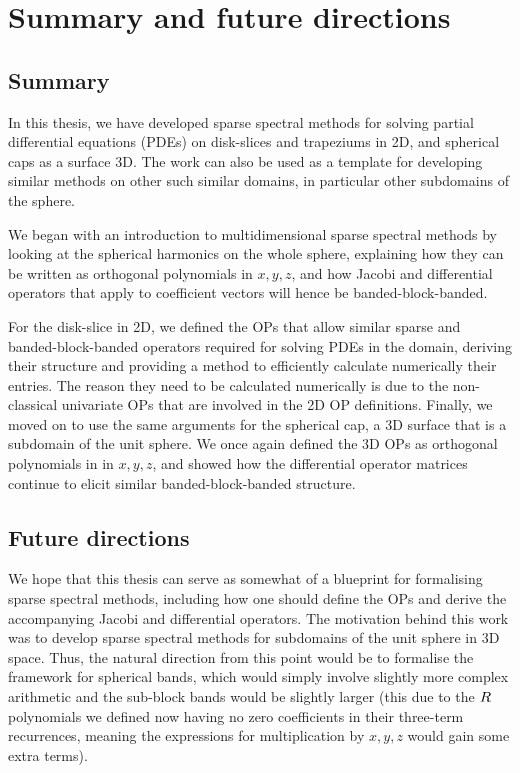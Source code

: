 

\chapter{Summary and future directions}

\section{Summary}

In this thesis, we have developed sparse spectral methods for solving partial differential equations (PDEs) on disk-slices and trapeziums in 2D, and spherical caps as a surface 3D. The work can also be used as a template for developing similar methods on other such similar domains, in particular other subdomains of the sphere.

We began with an introduction to multidimensional sparse spectral methods by looking at the spherical harmonics on the whole sphere, explaining how they can be written as orthogonal polynomials in $x,y,z$, and how Jacobi and differential operators that apply to coefficient vectors will hence be banded-block-banded.

For the disk-slice in 2D, we defined the OPs that allow similar sparse and banded-block-banded operators required for solving PDEs in the domain, deriving their structure and providing a method to efficiently calculate numerically their entries. The reason they need to be calculated numerically is due to the non-classical univariate OPs that are involved in the 2D OP definitions. Finally, we moved on to use the same arguments for the spherical cap, a 3D surface that is a subdomain of the unit sphere. We once again defined the 3D OPs as orthogonal polynomials in in $x,y,z$, and showed how the differential operator matrices continue to elicit similar banded-block-banded structure.


\section{Future directions}

We hope that this thesis can serve as somewhat of a blueprint for formalising sparse spectral methods, including how one should define the OPs and derive the accompanying Jacobi and differential operators. The motivation behind this work was to develop sparse spectral methods for subdomains of the unit sphere in 3D space. Thus, the natural direction from this point would be to formalise the framework for spherical bands, which would simply involve slightly more complex arithmetic and the sub-block bands would be slightly larger (this due to the $R$ polynomials we defined now having no zero coefficients in their three-term recurrences, meaning the expressions for multiplication by $x,y,z$ would gain some extra terms).

